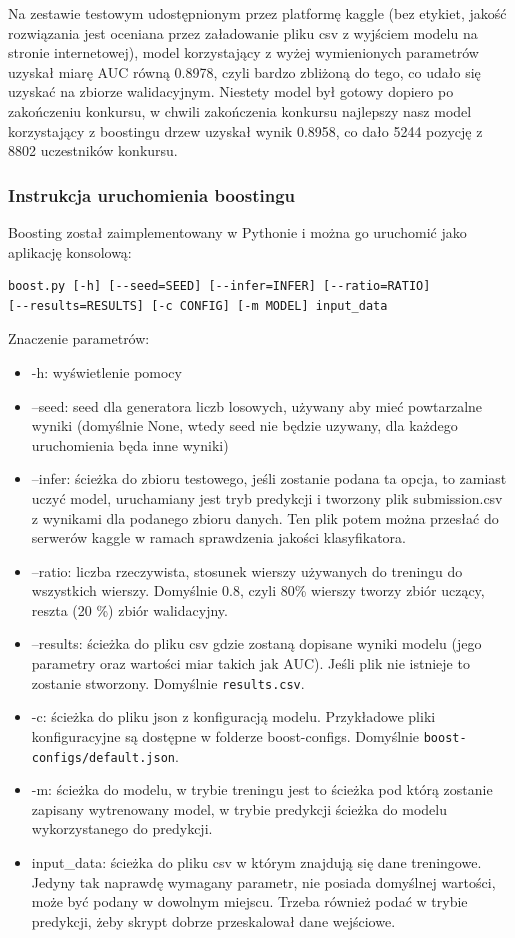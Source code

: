 \documentclass[12pt]{article}
\begin{document}
Na zestawie testowym udostępnionym przez platformę kaggle (bez etykiet, jakość rozwiązania jest oceniana przez załadowanie pliku csv z wyjściem modelu na stronie internetowej), model korzystający z wyżej wymienionych parametrów uzyskał miarę AUC równą 0.8978, czyli bardzo zbliżoną do tego, co udało się uzyskać na zbiorze walidacyjnym. Niestety model był gotowy dopiero po zakończeniu konkursu, w chwili zakończenia konkursu najlepszy nasz model korzystający z boostingu drzew uzyskał wynik 0.8958, co dało 5244 pozycję z 8802 uczestników konkursu.

\subsubsection{Instrukcja uruchomienia boostingu}

Boosting został zaimplementowany w Pythonie i można go uruchomić jako aplikację konsolową:

\begin{lstlisting}
boost.py [-h] [--seed=SEED] [--infer=INFER] [--ratio=RATIO]
[--results=RESULTS] [-c CONFIG] [-m MODEL] input_data
\end{lstlisting}

Znaczenie parametrów:

\begin{itemize}
    \item -h: wyświetlenie pomocy
    \item --seed: seed dla generatora liczb losowych, używany aby mieć powtarzalne wyniki (domyślnie None, wtedy seed nie będzie uzywany, dla każdego uruchomienia będa inne wyniki)
    \item --infer: ścieżka do zbioru testowego, jeśli zostanie podana ta opcja, to zamiast uczyć model, uruchamiany jest tryb predykcji i tworzony plik submission.csv z wynikami dla podanego zbioru danych. Ten plik potem można przesłać do serwerów kaggle w ramach sprawdzenia jakości klasyfikatora.
    \item --ratio: liczba rzeczywista, stosunek wierszy używanych do treningu do wszystkich wierszy. Domyślnie 0.8, czyli 80\% wierszy tworzy zbiór uczący, reszta (20 \%) zbiór walidacyjny.
    \item --results: ścieżka do pliku csv gdzie zostaną dopisane wyniki modelu (jego parametry oraz wartości miar takich jak AUC). Jeśli plik nie istnieje to zostanie stworzony. Domyślnie \verb"results.csv".
    \item -c: ścieżka do pliku json z konfiguracją modelu. Przykładowe pliki konfiguracyjne są dostępne w folderze boost-configs. Domyślnie \verb"boost-configs/default.json".
    \item -m: ścieżka do modelu, w trybie treningu jest to ścieżka pod którą zostanie zapisany wytrenowany model, w trybie predykcji ścieżka do modelu wykorzystanego do predykcji.
    \item input{\_}data: ścieżka do pliku csv w którym znajdują się dane treningowe. Jedyny tak naprawdę wymagany parametr, nie posiada domyślnej wartości, może być podany w dowolnym miejscu. Trzeba również podać w trybie predykcji, żeby skrypt dobrze przeskalował dane wejściowe.
\end{itemize}
\end{document}

